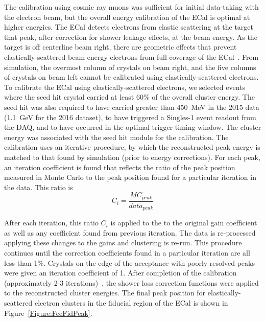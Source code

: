 The calibration using cosmic ray muons was sufficient for initial data-taking with the electron beam, but the overall energy calibration of the ECal is optimal at higher energies. The ECal detects electrons from elastic scattering at the target that peak, after correction for shower leakage effects, at the beam energy. As the target is off centerline beam right, there are geometric effects that prevent elastically-scattered beam energy electrons from full coverage of the ECal~\cite{szumila-vance_hps_2016}. From simulation, the overmost column of crystals on beam right, and the five columns of crystals on beam left cannot be calibrated using elastically-scattered electrons. \\
\indent To calibrate the ECal using elastically-scattered electrons, we selected events where the seed hit crystal carried at least 60$\%$ of the overall cluster energy. The seed hit was also required to have carried greater than 450~MeV in the 2015 data (1.1~GeV for the 2016 dataset), to have triggered a Singles-1  event readout from the DAQ, and to have occurred in the optimal trigger timing window. The cluster energy was associated with the seed hit module for the calibration. The calibration uses an iterative procedure, by which the reconstructed peak energy is matched to that found by simulation (prior to energy corrections). For each peak, an iteration coefficient is found that reflects the ratio of the peak position measured in Monte Carlo to the peak position found for a particular iteration in the data. This ratio is \\

\begin{equation}
	\label{eq:feeiter}
	C_i = \dfrac{MC_{peak}}{data_{peak}}
\end{equation}

After each iteration, this ratio $C_i$ is applied to the to the original gain coefficient as well as any coefficient found from previous iteration. The data is re-processed applying these changes to the gains and clustering is re-run. This procedure continues until the correction coefficients found in a particular iteration are all less than 1$\%$. Crystals on the edge of the acceptance with poorly resolved peaks were given an iteration coefficient of 1. After completion of the calibration (approximately 2-3 iterations)~\cite{szumila-vance_hps_2016}, the shower loss correction functions were applied to the reconstructed cluster energies. The final peak position for elastically-scattered electron clusters in the fiducial region of the ECal is shown in Figure~\ref{Figure:FeeFidPeak}.\\

